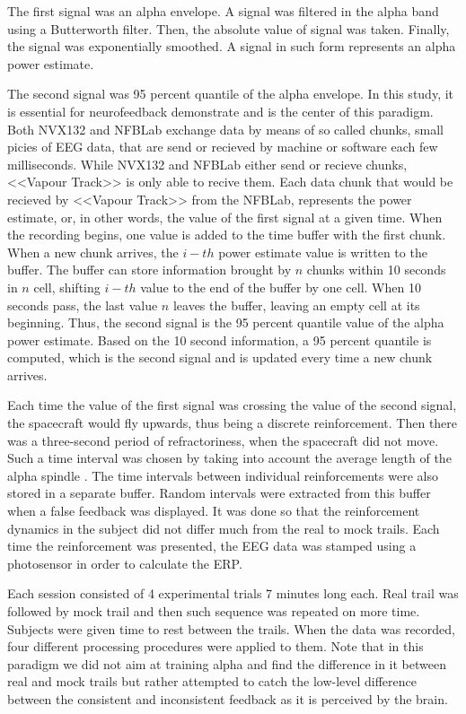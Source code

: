 \documentclass[14pt,a4paper]{scrartcl}
\begin{document}
The first signal was an alpha envelope. A signal was filtered in the alpha band using a Butterworth filter. Then, the absolute value of signal was taken. Finally, the signal was exponentially smoothed. A signal in such form represents an alpha power estimate. 

The second signal was 95 percent quantile of the alpha envelope. In this study, it is essential for neurofeedback demonstrate and is the center of this paradigm. Both NVX132 and NFBLab exchange data by means of so called chunks, small picies of EEG data, that are send or recieved by machine or software each few milliseconds. While NVX132 and NFBLab either send or recieve chunks, <<Vapour Track>> is only able to recive them. Each data chunk that would be recieved by <<Vapour Track>> from the NFBLab, represents the power estimate, or, in other words, the value of the first signal at a given time. When the recording begins, one value is added to the time buffer with the first chunk. When a new chunk arrives, the $i-th$ power estimate value is written to the buffer. The buffer can store information brought by $n$ chunks within 10 seconds in $n$ cell, shifting $i-th$ value to the end of the buffer by one cell. When 10 seconds pass, the last value $n$ leaves the buffer, leaving an empty cell at its beginning. Thus, the second signal is the 95 percent quantile value of the alpha power estimate. Based on the 10 second information, a 95 percent quantile is computed, which is the second signal and is updated every time a new chunk arrives.

Each time the value of the first signal was crossing the value of the second signal, the spacecraft would fly upwards, thus being a discrete reinforcement. Then there was a three-second period of refractoriness, when the spacecraft did not move. Such a time interval was chosen by taking into account the average length of the alpha spindle \cite{Bazanova2014}. The time intervals between individual reinforcements were also stored in a separate buffer. Random intervals were extracted from this buffer when a false feedback was displayed. It was done so that the reinforcement dynamics in the subject did not differ much from the real to mock trails. Each time the reinforcement was presented, the EEG data was stamped using a photosensor in order to calculate the ERP.

Each session consisted of 4 experimental trials 7 minutes long each. Real trail was followed by mock trail and then such sequence was repeated on more time. Subjects were given time to rest between the trails. When the data was recorded, four different processing procedures were applied to them. Note that in this paradigm we did not aim at training alpha and find the difference in it between real and mock trails but rather attempted to catch the low-level difference between the consistent and inconsistent feedback as it is perceived by the brain.
\end{document}

